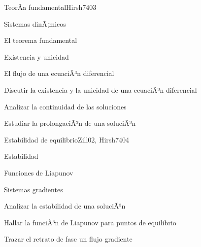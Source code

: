 \begin{syllabus}
\begin{unit}{TeorÃ­a fundamental}{Hirsh74}{0}{3}
\begin{topics}
      \item Sistemas dinÃ¡micos
      \item El teorema fundamental
      \item Existencia y unicidad
      \item El flujo de una ecuaciÃ³n diferencial
   \end{topics}

   \begin{unitgoals}
      \item Discutir la existencia y la unicidad de una ecuaciÃ³n diferencial
      \item Analizar la continuidad de las soluciones
      \item Estudiar la prolongaciÃ³n de una soluciÃ³n

   \end{unitgoals}
\end{unit}

\begin{unit}{Estabilidad de equilibrio}{Zill02, Hirsh74}{0}{4}
\begin{topics}
      \item Estabilidad
      \item Funciones de Liapunov
      \item Sistemas gradientes
   \end{topics}

   \begin{unitgoals}
      \item Analizar la estabilidad de una soluciÃ³n
      \item Hallar la funciÃ³n de Liapunov para puntos de  equilibrio
      \item Trazar el retrato de fase un flujo gradiente
    \end{unitgoals}
\end{unit}



\begin{coursebibliography}
\end{coursebibliography}

\end{syllabus}
